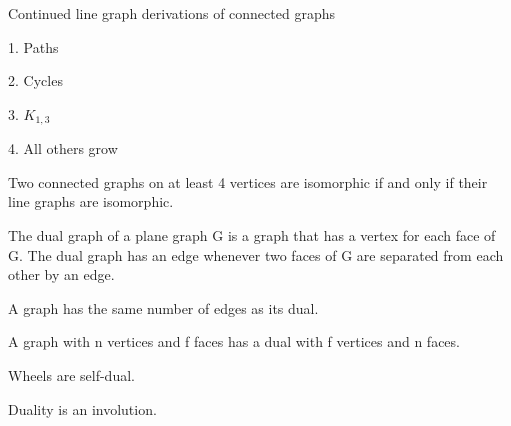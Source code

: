 Continued line graph derivations of connected graphs

    1.  Paths

    2.  Cycles

    3.  $K_{1,3}$

    4.  All others grow

\begin{theorem}
    Two connected graphs on at least 4 vertices are isomorphic if and only if their line graphs are isomorphic.
\end{theorem}





\begin{definition}
    The dual graph of a plane graph G is a graph that has a vertex for each face of G. The dual graph has an edge whenever two faces of G are separated from each other by an edge.
\end{definition}

\begin{theorem}
A graph has the same number of edges as its dual.
\end{theorem}

\begin{theorem}
A graph with n vertices and f faces has a dual with f vertices and n faces.
\end{theorem}

\begin{proposition}
    Wheels are self-dual.
\end{proposition}

\begin{proposition}
    Duality is an involution.
\end{proposition}
